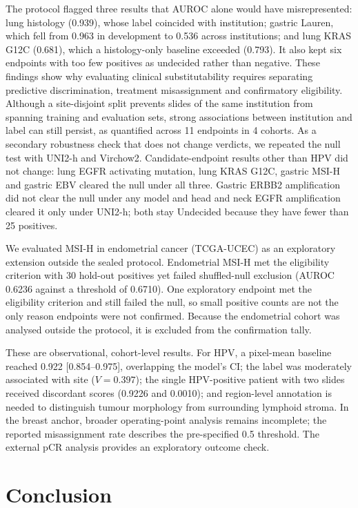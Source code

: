 \documentclass[a4paper,10pt,twocolumn]{extarticle}
\begin{document}
The protocol flagged three results that AUROC alone would have misrepresented: lung histology (0.939), whose label coincided with institution; gastric Lauren, which fell from 0.963 in development to 0.536 across institutions; and lung KRAS G12C (0.681), which a histology-only baseline exceeded (0.793). It also kept six endpoints with too few positives as undecided rather than negative. These findings show why evaluating clinical substitutability requires separating predictive discrimination, treatment misassignment and confirmatory eligibility. Although a site-disjoint split prevents slides of the same institution from spanning training and evaluation sets, strong associations between institution and label can still persist, as quantified across 11 endpoints in 4 cohorts. As a secondary robustness check that does not change verdicts, we repeated the null test with UNI2-h and Virchow2. Candidate-endpoint results other than HPV did not change: lung EGFR activating mutation, lung KRAS G12C, gastric MSI-H and gastric EBV cleared the null under all three. Gastric ERBB2 amplification did not clear the null under any model and head and neck EGFR amplification cleared it only under UNI2-h; both stay Undecided because they have fewer than 25 positives.

We evaluated MSI-H in endometrial cancer (TCGA-UCEC) as an exploratory extension outside the sealed protocol. Endometrial MSI-H met the eligibility criterion with 30 hold-out positives yet failed shuffled-null exclusion (AUROC 0.6236 against a threshold of 0.6710). One exploratory endpoint met the eligibility criterion and still failed the null, so small positive counts are not the only reason endpoints were not confirmed. Because the endometrial cohort was analysed outside the protocol, it is excluded from the confirmation tally.

These are observational, cohort-level results. For HPV, a pixel-mean baseline reached 0.922 [0.854--0.975], overlapping the model's CI; the label was moderately associated with site ($V=0.397$); the single HPV-positive patient with two slides received discordant scores (0.9226 and 0.0010); and region-level annotation is needed to distinguish tumour morphology from surrounding lymphoid stroma. In the breast anchor, broader operating-point analysis remains incomplete; the reported misassignment rate describes the pre-specified 0.5 threshold. The external pCR analysis provides an exploratory outcome check.

\section{Conclusion}
\end{document}
